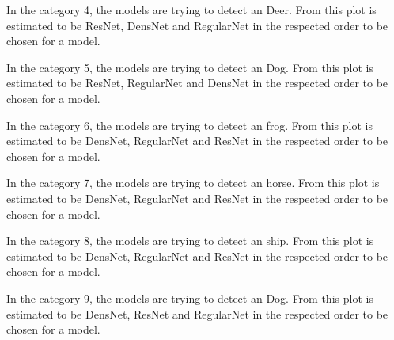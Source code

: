 \FloatBarrier 

In the category 4, the models are trying to detect an Deer. From this plot is estimated to be ResNet, DensNet and RegularNet in the respected order to be chosen for a model. 

\FloatBarrier 

In the category 5, the models are trying to detect an Dog. From this plot is estimated to be ResNet, RegularNet and DensNet in the respected order to be chosen for a model.

\FloatBarrier 

In the category 6, the models are trying to detect an frog. From this plot is estimated to be DensNet, RegularNet and ResNet in the respected order to be chosen for a model. 

\FloatBarrier 

In the category 7, the models are trying to detect an horse. From this plot is estimated to be DensNet, RegularNet and ResNet in the respected order to be chosen for a model.

\FloatBarrier 

In the category 8, the models are trying to detect an ship. From this plot is estimated to be DensNet, RegularNet and ResNet in the respected order to be chosen for a model. 

\FloatBarrier 

In the category 9, the models are trying to detect an Dog. From this plot is estimated to be DensNet, ResNet and RegularNet in the respected order to be chosen for a model. 

\FloatBarrier

